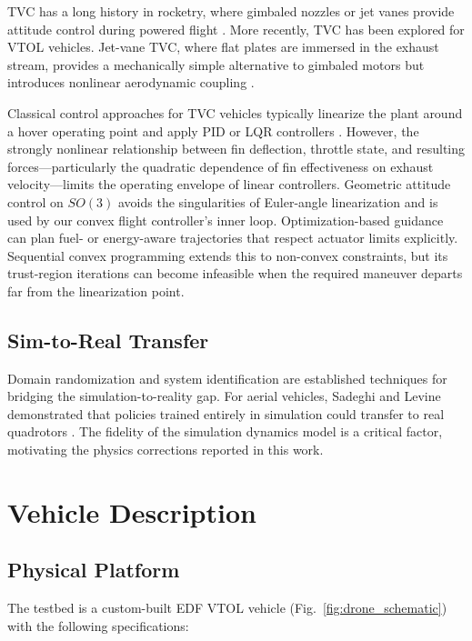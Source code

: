 \documentclass[conference]{IEEEtran}
\begin{document}
TVC has a long history in rocketry, where gimbaled nozzles or jet vanes provide attitude control during powered flight \cite{b8}. More recently, TVC has been explored for VTOL vehicles. Jet-vane TVC, where flat plates are immersed in the exhaust stream, provides a mechanically simple alternative to gimbaled motors but introduces nonlinear aerodynamic coupling \cite{b9}.

Classical control approaches for TVC vehicles typically linearize the plant around a hover operating point and apply PID or LQR controllers \cite{b10}. However, the strongly nonlinear relationship between fin deflection, throttle state, and resulting forces---particularly the quadratic dependence of fin effectiveness on exhaust velocity---limits the operating envelope of linear controllers. Geometric attitude control on $SO(3)$ \cite{b25} avoids the singularities of Euler-angle linearization and is used by our convex flight controller's inner loop. Optimization-based guidance can plan fuel- or energy-aware trajectories that respect actuator limits explicitly. Sequential convex programming extends this to non-convex constraints, but its trust-region iterations can become infeasible when the required maneuver departs far from the linearization point.

\subsection{Sim-to-Real Transfer}

Domain randomization \cite{b11} and system identification \cite{b12} are established techniques for bridging the simulation-to-reality gap. For aerial vehicles, Sadeghi and Levine demonstrated that policies trained entirely in simulation could transfer to real quadrotors \cite{b13}. The fidelity of the simulation dynamics model is a critical factor, motivating the physics corrections reported in this work.

\section{Vehicle Description}

\subsection{Physical Platform}

The testbed is a custom-built EDF VTOL vehicle (Fig.~\ref{fig:drone_schematic}) with the following specifications:
\end{document}
